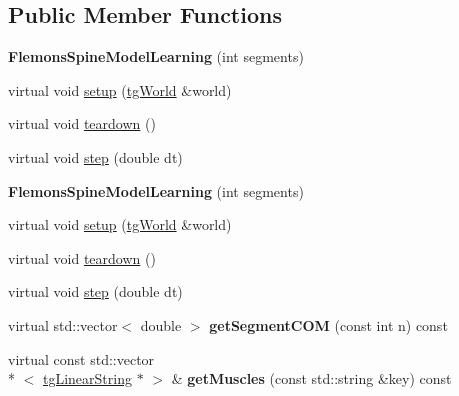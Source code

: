 \subsection*{Public Member Functions}
\begin{DoxyCompactItemize}
\item 
\hypertarget{class_flemons_spine_model_learning_a027b493482022b7605c72e6f915c0a2a}{{\bfseries Flemons\-Spine\-Model\-Learning} (int segments)}\label{class_flemons_spine_model_learning_a027b493482022b7605c72e6f915c0a2a}

\item 
virtual void \hyperlink{class_flemons_spine_model_learning_ad7d329634cf8d812bcee974a3430fcee}{setup} (\hyperlink{classtg_world}{tg\-World} \&world)
\item 
virtual void \hyperlink{class_flemons_spine_model_learning_a489aeb8529c20f9a2473812ea0e78f41}{teardown} ()
\item 
virtual void \hyperlink{class_flemons_spine_model_learning_ab0c5bc7a89e7358015877ed147b66da9}{step} (double dt)
\item 
\hypertarget{class_flemons_spine_model_learning_a027b493482022b7605c72e6f915c0a2a}{{\bfseries Flemons\-Spine\-Model\-Learning} (int segments)}\label{class_flemons_spine_model_learning_a027b493482022b7605c72e6f915c0a2a}

\item 
virtual void \hyperlink{class_flemons_spine_model_learning_a1c5e086a665023dbc637cfd617ddc094}{setup} (\hyperlink{classtg_world}{tg\-World} \&world)
\item 
virtual void \hyperlink{class_flemons_spine_model_learning_ab2f98f3230f4980bed706d9337a2fae5}{teardown} ()
\item 
virtual void \hyperlink{class_flemons_spine_model_learning_a29969832ceaa6143afcce7dfe1d6d8e8}{step} (double dt)
\item 
\hypertarget{class_base_spine_model_learning_afd3d71b99a2105a60c78d52d67068c00}{virtual std\-::vector$<$ double $>$ {\bfseries get\-Segment\-C\-O\-M} (const int n) const }\label{class_base_spine_model_learning_afd3d71b99a2105a60c78d52d67068c00}

\item 
\hypertarget{class_base_spine_model_learning_a0c595346fb7a23e89d9f6ec572a19c49}{virtual const std\-::vector\\*
$<$ \hyperlink{classtg_linear_string}{tg\-Linear\-String} $\ast$ $>$ \& {\bfseries get\-Muscles} (const std\-::string \&key) const }\label{class_base_spine_model_learning_a0c595346fb7a23e89d9f6ec572a19c49}


\end{DoxyCompactItemize}
